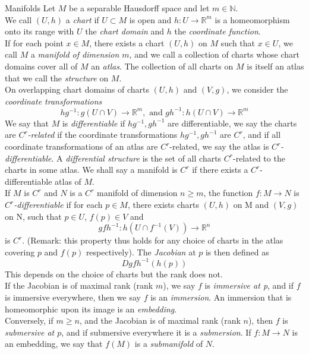 \documentclass[11pt, a4paper]{memoir}
\theoremstyle{break}
\theoremstyle{break}
\theoremstyle{nonumberplain}
\newcommand{\mN}{\mathbb{N}}
\newcommand{\mR}{\mathbb{R}}
\begin{document}
\begin{mydefinition}{Manifolds}
Let $M$ be a separable Hausdorff space and let $m\in \mN$.\\[5pt]
We call $(U,h)$ a \emph{chart} if $U\subset M$ is open and $h: U\to \mR^m$ is a homeomorphism onto its range with $U$ the \emph{chart domain} and $h$ the \emph{coordinate function}.\\[5pt]
If for each point $x\in M$, there exists a chart $(U,h)$ on $M$ such that $x\in U$, we call $M$ a \emph{manifold of dimension $m$}, and we call a collection of charts whose chart domains cover all of $M$ an \emph{atlas}. The collection of all charts on $M$ is itself an atlas that we call the \emph{structure} on $M$.\\[5pt]
On overlapping chart domains of charts $(U,h)$ and $(V,g)$, we consider the \emph{coordinate transformations}
$$hg^{-1}: g(U\cap V)\to \mR^m, \text{ and } gh^{-1}: h(U\cap V)\to \mR^m$$
We say that $M$ is \emph{differentiable} if $hg^{-1}, gh^{-1}$ are differentiable, we say the charts are \emph{$C^r$-related} if the coordinate transformations $hg^{-1}, gh^{-1}$ are $C^r$, and if all coordinate transformations of an atlas are $C^r$-related, we say the atlas is \emph{$C^r$-differentiable}. A \emph{differential structure} is the set of all charts $C^r$-related to the charts in some atlas. We shall say a manifold is $C^r$ if there exists a $C^r$-differentiable atlas of $M$.\\[5pt]
If $M$ is $C^r$ and $N$ is a $C^r$ manifold of dimension $n\geqslant m$, the function $f: M\to N$ is \emph{$C^r$-differentiable} if for each $p\in M$, there exists charts $(U,h)$ on M and $(V,g)$ on N, such that $p\in U$, $f(p)\in V$ and 
$$gfh^{-1}: h(U\cap f^{-1}(V))\to \mR^n$$
is $C^r$. (Remark: this property thus holds for any choice of charts in the atlas covering $p$ and $f(p)$ respectively). The \emph{Jacobian} at $p$ is then defined as 
$$Dgfh^{-1}(h(p))$$
This depends on the choice of charts but the rank does not.\\[5pt]
If the Jacobian is of maximal rank (rank $m$), we say $f$ is \emph{immersive at p}, and if $f$ is immersive everywhere, then we say $f$ is an \emph{immersion}. An immersion that is homeomorphic upon its image is an \emph{embedding}.\\[5pt]
Conversely, if $m\geqslant n$, and the Jacobian is of maximal rank (rank $n$), then $f$ is \emph{submersive at $p$}, and if submersive everywhere it is a \emph{submersion}. If $f: M\to N$ is an embedding, we say that $f(M)$ is a \emph{submanifold} of $N$.\\[5pt]

\end{mydefinition}
\end{document}

